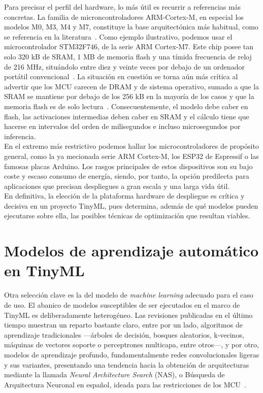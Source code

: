\documentclass[a4paper,12pt,twoside,final]{book}
\begin{document}
Para precisar el perfil del hardware, lo más útil es recurrir a referencias más concretas. La familia de
microncontroladores ARM-Cortex-M, en especial los modelos M0, M3, M4 y M7, constituye la base arquitectónica más
habitual, como se referencia en la literatura~\cite{ray2022kingsaud,hong2024etri,lin2023ieeemcas,
abadade2023ieeeaccess,somvanshi2025acm}. Como ejemplo ilustrativo, podemos usar el microcontrolador STM32F746, de la
serie ARM Cortex-M7. Este chip posee tan solo 320 kB de SRAM, 1 MB de memoria flash y una tímida frecuencia de reloj
de 216 MHz, situándolo entre diez y veinte veces por debajo de un ordenador portátil
convencional~\cite{lin2023ieeemcas}. La situación en cuestión se torna aún más crítica al advertir que los MCU
carecen de DRAM y de sistema operativo, sumado a que la SRAM se mantiene por debajo de los 256 kB en la mayoría de
los casos y que la memoria flash es de solo lectura~\cite{lin2023ieeemcas}. Consecuentemente, el modelo debe caber
en flash, las activaciones intermedias deben caber en SRAM y el cálculo tiene que hacerse en intervalos del orden
de milisegundos e incluso microsegundos por inferencia.\\

En el extremo más restrictivo podemos hallar los microcontroladores de propósito general, como la ya mecionada serie
ARM Cortex-M, los ESP32 de Espressif o las famosas placas Arduino. Los rasgos principales de estos dispositivos son
su bajo coste y escaso consumo de energía, siendo, por tanto, la opción predilecta para aplicaciones que precisan
despliegues a gran escala y una larga vida útil.\\

En definitiva, la elección de la plataforma hardware de despliegue es crítica y decisiva en un proyecto TinyML, pues
determina, además de qué modelos pueden ejecutarse sobre ella, las posibles técnicas de optimización que resultan
viables.

\section{Modelos de aprendizaje automático en TinyML}
Otra selección clave es la del modelo de \textit{machine learning} adecuado para el caso de uso. El abanico de
modelos susceptibles de ser ejecutados en el marco de TinyML es deliberadamente heterogéneo. Las revisiones
publicadas en el último tiempo muestran un reparto bastante claro, entre por un lado, algoritmos de aprendizaje
tradicionales ---árboles de decisión, bosques aleatorios, k-vecinos, máquinas de vectores soporte o perceptrones
multicapa, entre otros---, y por otro, modelos de aprendizaje profundo, fundamentalmente redes convolucionales
ligeras y sus variantes, presentando una tendencia hacia la obtención de arquitecturas mediante la llamada
\textit{Neural Architecture Search} (NAS), o Búsqueda de Arquitectura Neuronal en español, ideada para las
restricciones de los MCU~\cite{saha2022ieeejsen,alajlan2022micromachines}.\\
\end{document}
